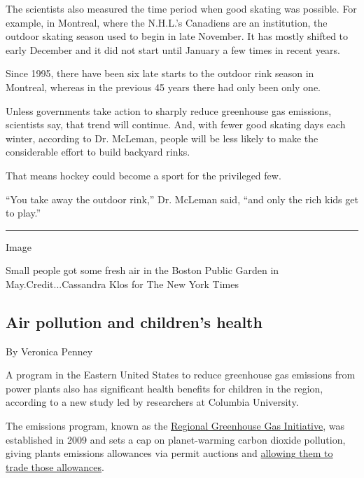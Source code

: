 The scientists also measured the time period when good skating was
possible. For example, in Montreal, where the N.H.L.'s Canadiens are an
institution, the outdoor skating season used to begin in late November.
It has mostly shifted to early December and it did not start until
January a few times in recent years.

Since 1995, there have been six late starts to the outdoor rink season
in Montreal, whereas in the previous 45 years there had only been only
one.

Unless governments take action to sharply reduce greenhouse gas
emissions, scientists say, that trend will continue. And, with fewer
good skating days each winter, according to Dr. McLeman, people will be
less likely to make the considerable effort to build backyard rinks.

That means hockey could become a sport for the privileged few.

``You take away the outdoor rink,'' Dr. McLeman said, ``and only the
rich kids get to play.''

\begin{center}\rule{0.5\linewidth}{\linethickness}\end{center}

Image

Small people got some fresh air in the Boston Public Garden in
May.Credit...Cassandra Klos for The New York Times

\hypertarget{air-pollution-and-childrens-health}{%
\subsection{Air pollution and children's
health}\label{air-pollution-and-childrens-health}}

By Veronica Penney

A program in the Eastern United States to reduce greenhouse gas
emissions from power plants also has significant health benefits for
children in the region, according to a new study led by researchers at
Columbia University.

The emissions program, known as the
\href{https://www.rggi.org/program-overview-and-design/elements}{Regional
Greenhouse Gas Initiative}, was established in 2009 and sets a cap on
planet-warming carbon dioxide pollution, giving plants emissions
allowances via permit auctions and
\href{https://www.nytimes3xbfgragh.onion/interactive/2019/04/02/climate/pricing-carbon-emissions.html}{allowing
them to trade those allowances}.

